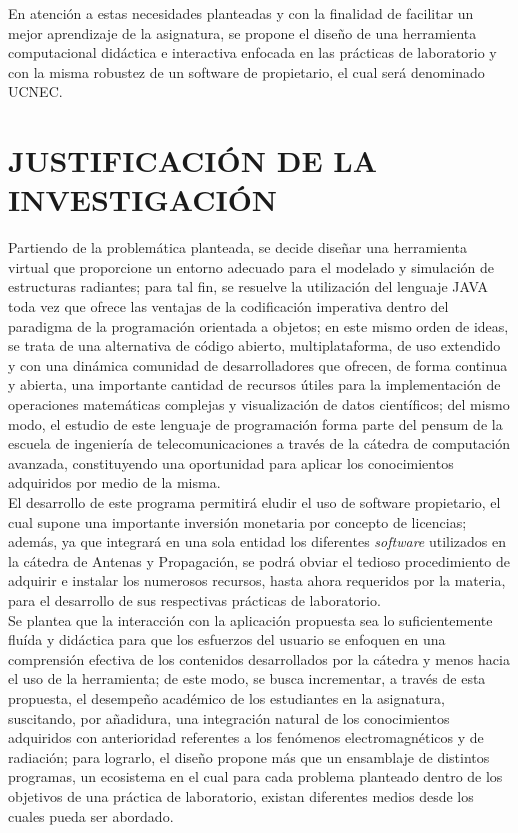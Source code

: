 En atención a estas necesidades planteadas y con la finalidad de facilitar un mejor aprendizaje de la asignatura, se propone el diseño de una herramienta computacional didáctica e interactiva enfocada en las prácticas de laboratorio y con la misma robustez de un software de propietario, el cual será denominado UCNEC.


\newpage
\section{JUSTIFICACIÓN DE LA INVESTIGACIÓN}

Partiendo de la problemática planteada, se decide diseñar una herramienta virtual que proporcione un entorno adecuado para el modelado y simulación de estructuras radiantes; para tal fin, se resuelve la utilización del lenguaje JAVA toda vez que ofrece las ventajas de la codificación imperativa dentro del paradigma de la programación orientada a objetos; en este mismo orden de ideas, se trata de una alternativa de código abierto, multiplataforma, de uso extendido y con una dinámica comunidad de desarrolladores que ofrecen, de forma continua y abierta, una importante cantidad de recursos útiles para la implementación de operaciones matemáticas complejas y visualización de datos científicos; del mismo modo, el estudio de este lenguaje de programación forma parte del pensum de la escuela de ingeniería de telecomunicaciones a través de la cátedra de computación avanzada, constituyendo una oportunidad para aplicar los conocimientos adquiridos por medio de la misma.\\
El desarrollo de este programa permitirá eludir el uso de software propietario, el cual supone una importante inversión monetaria por concepto de licencias; además, ya que integrará en una sola entidad los diferentes \textit{software} utilizados en la cátedra de Antenas y Propagación, se podrá obviar el tedioso procedimiento de adquirir e instalar los numerosos recursos, hasta ahora requeridos por la materia, para el desarrollo de sus respectivas prácticas de laboratorio.\\
Se plantea que la interacción con la aplicación propuesta sea lo suficientemente fluída y didáctica para que los esfuerzos del usuario se enfoquen en una comprensión efectiva de los contenidos desarrollados por la cátedra y menos hacia el uso de la herramienta; de este modo, se busca incrementar, a través de esta propuesta, el desempeño académico de los estudiantes en la asignatura, suscitando, por añadidura, una integración natural de los conocimientos adquiridos con anterioridad referentes a los fenómenos electromagnéticos y de radiación; para lograrlo, el diseño propone más que un ensamblaje de distintos programas, un ecosistema en el cual para cada problema planteado dentro de los objetivos de una práctica de laboratorio, existan diferentes medios desde los cuales pueda ser abordado.\\
